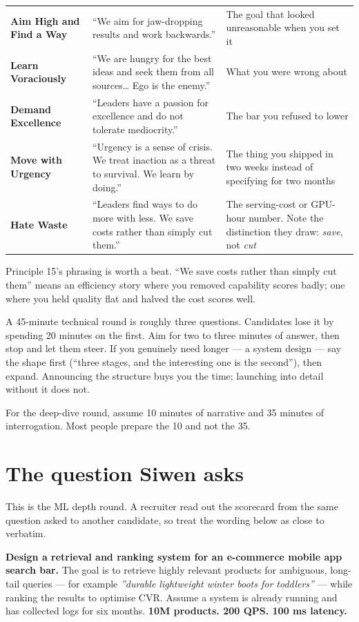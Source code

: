 \documentclass[10pt,twoside]{book}
\newcommand{\cchapter}[1]{\chapter{#1}}
\newcommand{\csection}[1]{\par\vspace{13pt}\noindent{\sffamily\large\bfseries\color{ink}\raggedright #1\par}\vspace{4pt}}
\newenvironment{callout}{\begin{tcolorbox}[colback=soft,colframe=accent,boxrule=0.5pt,left=7pt,right=7pt,top=5pt,bottom=5pt]}{\end{tcolorbox}}
\begin{document}
{\begin{tabularx}{\linewidth}{YYY}
\textbf{Aim High and Find a Way} & ``We aim for jaw-dropping results and work backwards.'' & The goal that looked unreasonable when you set it \\
\textbf{Learn Voraciously} & ``We are hungry for the best ideas and seek them from all sources\ldots{} Ego is the enemy.'' & What you were wrong about \\
\textbf{Demand Excellence} & ``Leaders have a passion for excellence and do not tolerate mediocrity.'' & The bar you refused to lower \\
\textbf{Move with Urgency} & ``Urgency is a sense of crisis. We treat inaction as a threat to survival. We learn by doing.'' & The thing you shipped in two weeks instead of specifying for two months \\
\textbf{Hate Waste} & ``Leaders find ways to do more with less. We save costs rather than simply cut them.'' & The serving-cost or GPU-hour number. Note the distinction they draw: \textit{save}, not \textit{cut} \\
\hline\end{tabularx}}\par\medskip
Principle 15's phrasing is worth a beat. ``We save costs rather than simply cut them'' means an efficiency story where you removed capability scores badly; one where you held quality flat and halved the cost scores well.\par
\csection{Budgeting the time inside a round}
A 45-minute technical round is roughly three questions. Candidates lose it by spending 20 minutes on the first. Aim for two to three minutes of answer, then stop and let them steer. If you genuinely need longer --- a system design --- say the shape first (``three stages, and the interesting one is the second''), then expand. Announcing the structure buys you the time; launching into detail without it does not.\par
For the deep-dive round, assume 10 minutes of narrative and 35 minutes of interrogation. Most people prepare the 10 and not the 35.\par
\cchapter{The question Siwen asks}
This is the ML depth round. A recruiter read out the scorecard from the same question asked to another candidate, so treat the wording below as close to verbatim.\par
\begin{callout}\textbf{Design a retrieval and ranking system for an e-commerce mobile app search bar.} The goal is to retrieve highly relevant products for ambiguous, long-tail queries --- for example \textit{''durable lightweight winter boots for toddlers''} --- while ranking the results to optimise CVR. Assume a system is already running and has collected logs for six months. \textbf{10M products. 200 QPS. 100 ms latency.}\end{callout}
\end{document}

